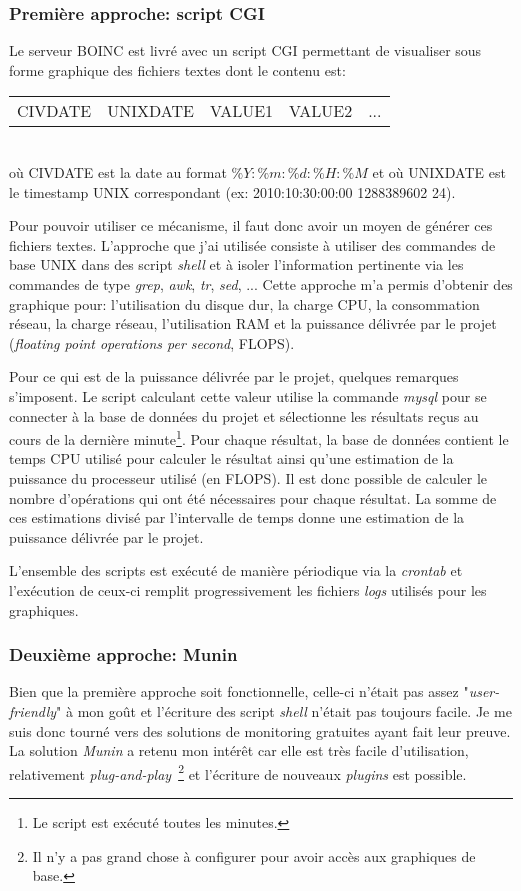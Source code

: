 \documentclass[a4paper, 11pt]{report}
\begin{document}
\subsubsection{Première approche: script CGI}
Le serveur \textsc{BOINC} est livré avec un script CGI permettant de visualiser sous forme graphique des fichiers textes dont le contenu est:\\
\begin{tabular}{ccccc}
CIVDATE & UNIXDATE & VALUE1 & VALUE2 & ...\\
\end{tabular}\\
où CIVDATE est la date au format $\%Y:\%m:\%d:\%H:\%M$ et où UNIXDATE est le timestamp UNIX correspondant (ex: 2010:10:30:00:00 1288389602 24).

Pour pouvoir utiliser ce mécanisme, il faut donc avoir un moyen de générer ces fichiers textes. L'approche que j'ai utilisée consiste à utiliser des commandes de base UNIX dans des script \textit{shell} et à isoler l'information pertinente via les commandes de type \textit{grep}, \textit{awk}, \textit{tr}, \textit{sed}, ... Cette approche m'a permis d'obtenir des graphique pour: l'utilisation du disque dur, la charge CPU, la consommation réseau, la charge réseau, l'utilisation RAM et la puissance délivrée par le projet (\textit{floating point operations per second}, FLOPS).

Pour ce qui est de la puissance délivrée par le projet, quelques remarques s'imposent. Le script calculant cette valeur utilise la commande \textit{mysql} pour se connecter à la base de données du projet et sélectionne les résultats reçus au cours de la dernière minute\footnote{Le script est exécuté toutes les minutes.}. Pour chaque résultat, la base de données contient le temps CPU utilisé pour calculer le résultat ainsi qu'une estimation de la puissance du processeur utilisé (en FLOPS). Il est donc possible de calculer le nombre d'opérations qui ont été nécessaires pour chaque résultat. La somme de ces estimations divisé par l'intervalle de temps donne une estimation de la puissance délivrée par le projet.

L'ensemble des scripts est exécuté de manière périodique via la \textit{crontab} et l'exécution de ceux-ci remplit progressivement les fichiers \textit{logs} utilisés pour les graphiques.

\subsubsection{Deuxième approche: Munin}
Bien que la première approche soit fonctionnelle, celle-ci n'était pas assez "\textit{user-friendly}" à mon goût et l'écriture des script \textit{shell} n'était pas toujours facile. Je me suis donc tourné vers des solutions de monitoring gratuites ayant fait leur preuve. La solution \textit{Munin} a retenu mon intérêt car elle est très facile d'utilisation, relativement \textit{plug-and-play}~\footnote{Il n'y a pas grand chose à configurer pour avoir accès aux graphiques de base.} et l'écriture de nouveaux \textit{plugins} est possible.%
\end{document}
